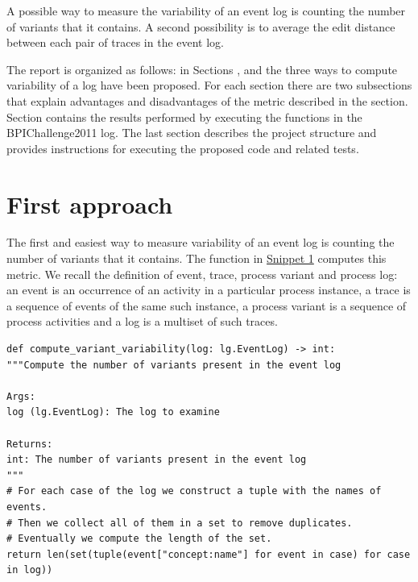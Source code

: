 \documentclass[12pt]{article}
\newenvironment{code}{\captionsetup{type=listing}}{}
\begin{document}
\smallskip
A possible way to measure the variability of an event log is counting the number of variants that it contains. A second possibility is to average the edit distance between each pair of traces in the event log. 

\smallskip
The report is organized as follows: in Sections ,  and  the three ways to compute variability of a log have been proposed. For each section there are two subsections that explain advantages and disadvantages of the metric described in the section. Section  contains the results performed by executing the functions in the BPIChallenge2011 log. The last section  describes the project structure and provides instructions for executing the proposed code and related tests.


\section*{First approach}\label{section:first}

The first and easiest way to measure variability of an event log is counting the number of variants that it contains. The function in \hyperref[code:code1]{Snippet 1} computes this metric. We recall the definition of event, trace, process variant and process log: an event is an occurrence of an activity in a particular process instance, a trace is a sequence of events of the same such instance, a process variant is a sequence of process activities and a log is a multiset of such traces.

\begin{code}
	\label{code:code1}
	\begin{verbatim}
def compute_variant_variability(log: lg.EventLog) -> int:
"""Compute the number of variants present in the event log

Args:
log (lg.EventLog): The log to examine

Returns:
int: The number of variants present in the event log
"""
# For each case of the log we construct a tuple with the names of events.
# Then we collect all of them in a set to remove duplicates.
# Eventually we compute the length of the set.
return len(set(tuple(event["concept:name"] for event in case) for case in log))
	\end{verbatim}
\end{code}
\end{document}
